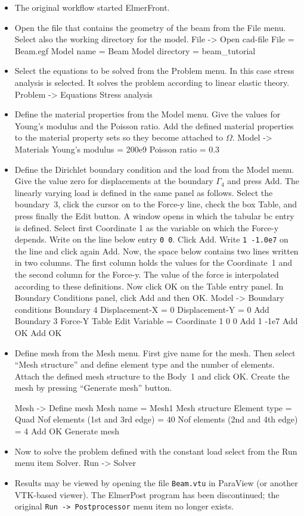 \begin{itemize}
\item The original workflow started ElmerFront.
\item Open the file that contains the geometry of the beam from 
the File menu. Select also the working directory for the model.
\ttbegin
File -> Open cad-file 
  File = Beam.egf 
  Model name = Beam 
  Model directory = beam_tutorial
\ttend
\item Select the equations to be solved from the Problem menu. In this 
case stress analysis is selected. It solves the problem according to 
linear elastic theory. 
\ttbegin
Problem -> Equations 
  Stress analysis 
\ttend
\item Define the material properties from the Model menu. Give the values for 
Young's modulus and the Poisson ratio. Add the defined material 
properties to the material property sets so they become attached 
to $\Omega$. 
\ttbegin
Model -> Materials 
  Young's modulus = 200e9 
  Poisson ratio = 0.3
\ttend

\item Define the Dirichlet boundary condition and the load from the
Model menu. Give the value zero for displacements at the boundary
$\Gamma_4$ and press Add. The linearly varying load is defined in the
same panel as follows.  Select the boundary~3, click the cursor on to
the Force-y line, check the box Table, and press finally the Edit
button. A window opens in which the tabular bc entry is
defined. Select first Coordinate 1 as the variable on which the
Force-y depends. Write on the line below entry {\tt 0 0}. Click
Add. Write {\tt 1 -1.0e7} on the line and click again Add. Now, the
space below contains two lines written in two columns. The first
column holds the values for the Coordinate~1 and the second column for
the Force-y. The value of the force is interpolated according to these
definitions. Now click OK on the Table entry panel. In Boundary
Conditions panel, click Add and then OK.
\ttbegin
Model -> Boundary conditions
Boundary 4
Displacement-X = 0
Displacement-Y = 0
Add
Boundary 3
Force-Y
Table
Edit
Variable = Coordinate 1
0 0
Add
1 -1e7
Add
OK
Add
OK
\ttend

\item Define mesh from the Mesh menu. First give name for the
mesh. Then select ``Mesh structure'' and define element type and the
number of elements. Attach the defined mesh structure to the Body~1
and click OK. Create the mesh by pressing ``Generate mesh'' button.

\ttbegin 
Mesh -> Define mesh 
Mesh name = Mesh1 
Mesh structure 
Element type = Quad 
Nof elements (1st and 3rd edge) = 40 
Nof elements (2nd and 4th edge) = 4 
Add 
OK 
Generate mesh 
\ttend
\item Now to solve the problem defined with the constant load select from 
the Run menu item Solver. 
\ttbegin
Run -> Solver 
\ttend
\item Results may be viewed by opening the file {\tt Beam.vtu} in ParaView
(or another VTK-based viewer). The ElmerPost program has been discontinued;
the original {\tt Run -> Postprocessor} menu item no longer exists.
\end{itemize}


